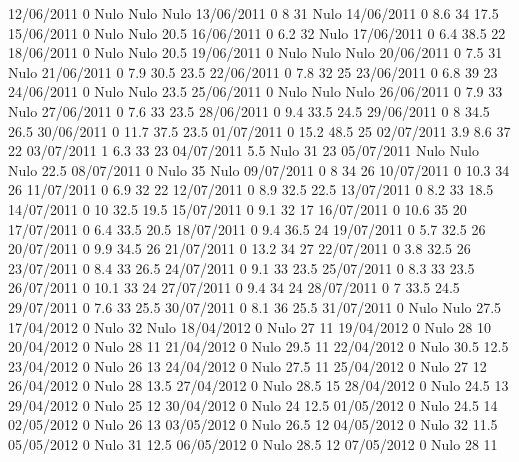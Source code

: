 12/06/2011  0     Nulo   Nulo   Nulo
13/06/2011  0      8      31    Nulo
14/06/2011  0      8.6    34     17.5 
15/06/2011  0     Nulo   Nulo    20.5 
16/06/2011  0      6.2    32    Nulo
17/06/2011  0      6.4    38.5   22 
18/06/2011  0     Nulo   Nulo    20.5 
19/06/2011  0     Nulo   Nulo   Nulo
20/06/2011  0      7.5    31    Nulo
21/06/2011  0      7.9    30.5   23.5 
22/06/2011  0      7.8    32     25 
23/06/2011  0      6.8    39     23 
24/06/2011  0     Nulo   Nulo    23.5 
25/06/2011  0     Nulo   Nulo   Nulo
26/06/2011  0      7.9    33    Nulo
27/06/2011  0      7.6    33     23.5 
28/06/2011  0      9.4    33.5   24.5 
29/06/2011  0      8      34.5   26.5 
30/06/2011  0      11.7   37.5   23.5 
01/07/2011  0      15.2   48.5   25 
02/07/2011  3.9    8.6    37     22 
03/07/2011  1      6.3    33     23 
04/07/2011  5.5   Nulo    31     23 
05/07/2011 Nulo   Nulo   Nulo    22.5 
08/07/2011  0     Nulo    35    Nulo
09/07/2011  0      8      34     26 
10/07/2011  0      10.3   34     26 
11/07/2011  0      6.9    32     22 
12/07/2011  0      8.9    32.5   22.5 
13/07/2011  0      8.2    33     18.5 
14/07/2011  0      10     32.5   19.5 
15/07/2011  0      9.1    32     17 
16/07/2011  0      10.6   35     20 
17/07/2011  0      6.4    33.5   20.5 
18/07/2011  0      9.4    36.5   24 
19/07/2011  0      5.7    32.5   26 
20/07/2011  0      9.9    34.5   26 
21/07/2011  0      13.2   34     27 
22/07/2011  0      3.8    32.5   26 
23/07/2011  0      8.4    33     26.5 
24/07/2011  0      9.1    33     23.5 
25/07/2011  0      8.3    33     23.5 
26/07/2011  0      10.1   33     24 
27/07/2011  0      9.4    34     24 
28/07/2011  0      7      33.5   24.5 
29/07/2011  0      7.6    33     25.5 
30/07/2011  0      8.1    36     25.5 
31/07/2011  0     Nulo   Nulo    27.5 
17/04/2012  0     Nulo    32    Nulo
18/04/2012  0     Nulo    27     11 
19/04/2012  0     Nulo    28     10 
20/04/2012  0     Nulo    28     11 
21/04/2012  0     Nulo    29.5   11 
22/04/2012  0     Nulo    30.5   12.5 
23/04/2012  0     Nulo    26     13 
24/04/2012  0     Nulo    27.5   11 
25/04/2012  0     Nulo    27     12 
26/04/2012  0     Nulo    28     13.5 
27/04/2012  0     Nulo    28.5   15 
28/04/2012  0     Nulo    24.5   13 
29/04/2012  0     Nulo    25     12 
30/04/2012  0     Nulo    24     12.5 
01/05/2012  0     Nulo    24.5   14 
02/05/2012  0     Nulo    26     13 
03/05/2012  0     Nulo    26.5   12 
04/05/2012  0     Nulo    32     11.5 
05/05/2012  0     Nulo    31     12.5 
06/05/2012  0     Nulo    28.5   12 
07/05/2012  0     Nulo    28     11 
